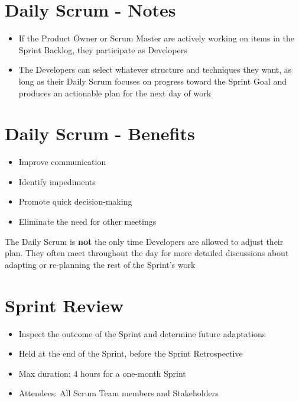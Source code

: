 \documentclass[a4paper,11pt,twocolumn]{article}
\begin{document}
\section*{Daily Scrum - Notes}
\begin{itemize}
	\item If the Product Owner or Scrum Master are actively working on items in the Sprint Backlog, they participate as Developers
	\item The Developers can select whatever structure and techniques they want, as long as their Daily Scrum focuses on progress toward the Sprint Goal and produces an actionable plan for the next day of work
\end{itemize}

\section*{Daily Scrum - Benefits}
\begin{itemize}
	\item Improve communication
	\item Identify impediments
	\item Promote quick decision-making
	\item Eliminate the need for other meetings
\end{itemize}

\begin{tcolorbox}[colback=black!8!white,colframe=gray!50!black,title=Note,sharp corners,fonttitle=\normalsize\bfseries,fontupper=\normalsize,left=0.7em,right=0.7em]
	The Daily Scrum is \textbf{not} the only time Developers are allowed to adjust their plan. They often meet throughout the day for more detailed discussions about adapting or re-planning the rest of the Sprint's work
\end{tcolorbox}

\section*{Sprint Review}
\begin{itemize}
	\item Inspect the outcome of the Sprint and determine future adaptations
	\item Held at the end of the Sprint, before the Sprint Retrospective
	\item Max duration: 4 hours for a one-month Sprint
	\item Attendees: All Scrum Team members and Stakeholders
\end{itemize}
\end{document}
